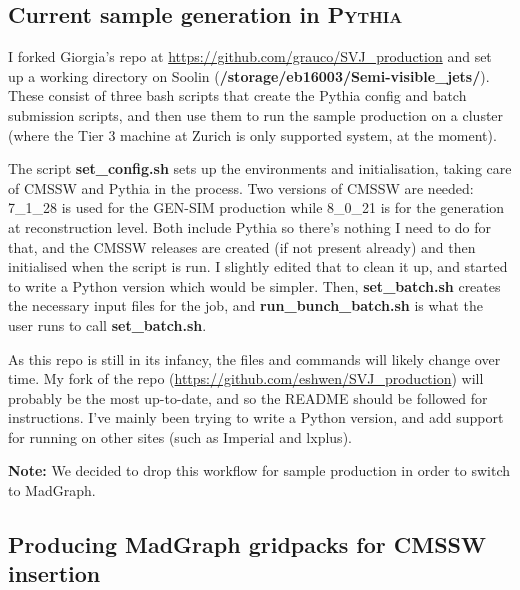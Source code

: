 

\subsection{Current sample generation in \textsc{Pythia}}

I forked Giorgia's repo at \url{https://github.com/grauco/SVJ_production} and set up a working directory on Soolin (\textbf{/storage/eb16003/Semi-visible\_jets/}). These consist of three bash scripts that create the Pythia config and batch submission scripts, and then use them to run the sample production on a cluster (where the Tier 3 machine at Zurich is only supported system, at the moment).

The script \textbf{set\_config.sh} sets up the environments and initialisation, taking care of CMSSW and Pythia in the process. Two versions of CMSSW are needed: 7\_1\_28 is used for the GEN-SIM production while 8\_0\_21 is for the generation at reconstruction level. Both include Pythia so there's nothing I need to do for that, and the CMSSW releases are created (if not present already) and then initialised when the script is run. I slightly edited that to clean it up, and started to write a Python version which would be simpler. Then, \textbf{set\_batch.sh} creates the necessary input files for the job, and \textbf{run\_bunch\_batch.sh} is what the user runs to call \textbf{set\_batch.sh}.

As this repo is still in its infancy, the files and commands will likely change over time. My fork of the repo (\url{https://github.com/eshwen/SVJ_production}) will probably be the most up-to-date, and so the README should be followed for instructions. I've mainly been trying to write a Python version, and add support for running on other sites (such as Imperial and lxplus).

\textbf{Note:} We decided to drop this workflow for sample production in order to switch to MadGraph.


\subsection{Producing MadGraph gridpacks for CMSSW insertion}

